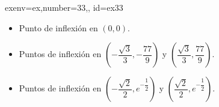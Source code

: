 \begin{SolutionCollapsible}{exenv=ex,number=33,, id=ex33}

		\begin{itemize}
			\item Punto de inflexión en $(0,0)$.
			\item Puntos de inflexión en $(-\dfrac{\sqrt{3}}{3},-\dfrac{77}{9})$ y $(\dfrac{\sqrt{3}}{3},\dfrac{77}{9})$.
			\item Puntos de inflexión en $(-\dfrac{\sqrt{2}}{2},e^{-\dfrac{1}{2}})$ y $(\dfrac{\sqrt{2}}{2},e^{-\dfrac{1}{2}})$.
		\end{itemize}
	
\end{SolutionCollapsible}
